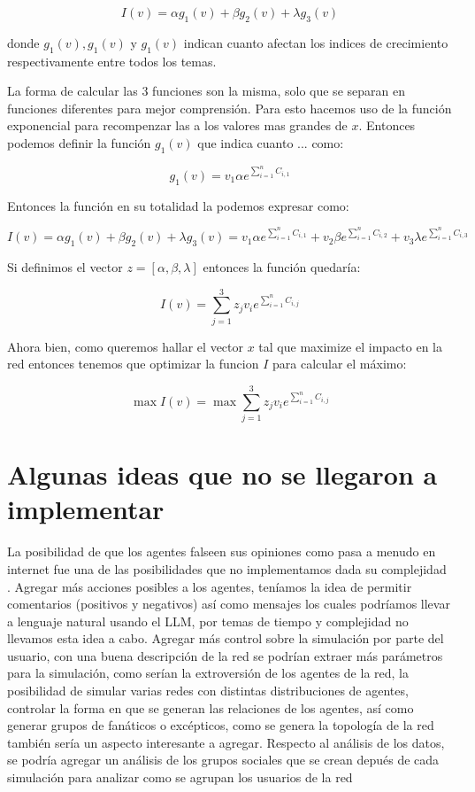 \documentclass[acmtog]{acmart}
\begin{document}
$$
I(v) = \alpha g_1(v) + \beta g_2(v) + \lambda g_3(v)
$$

donde $g_1(v), g_1(v)$ y $g_1(v)$ indican cuanto afectan los indices de crecimiento respectivamente entre todos los temas.

La forma de calcular las 3 funciones son la misma, solo que se separan en funciones diferentes para mejor comprensión. Para esto hacemos uso de la función exponencial para recompenzar las a los valores mas grandes de $x$. Entonces podemos definir la función $g_1(v)$ que indica cuanto ... como:

$$
g_1(v) = v_1 \alpha e ^ {\sum_{i=1}^{n} C_{i,1}} 
$$

Entonces la función en su totalidad la podemos expresar como:

$$
I(v) = \alpha g_1(v) + \beta g_2(v) + \lambda g_3(v) = v_1 \alpha e ^ {\sum_{i=1}^{n} C_{i,1}} + v_2 \beta e ^ {\sum_{i=1}^{n} C_{i,2}} + v_3 \lambda e ^ {\sum_{i=1}^{n} C_{i,3}}
$$

Si definimos el vector $z = [\alpha, \beta, \lambda]$ entonces la función quedaría:

$$
I(v) = \sum_{j=1}^{3} z_j v_i  e ^ {\sum_{i=1}^{n} C_{i,j}}
$$

Ahora bien, como queremos hallar el vector $x$ tal que maximize el impacto en la red entonces tenemos que optimizar la funcion $I$ para calcular el máximo:

$$
\max I(v) = \max \sum_{j=1}^{3} z_j v_i e ^ {\sum_{i=1}^{n} C_{i,j}}
$$


\section{Algunas ideas que no se llegaron a implementar}
La posibilidad de que los agentes falseen sus opiniones como pasa a menudo en internet fue una de las posibilidades que no implementamos dada su complejidad . Agregar más acciones posibles a los agentes, teníamos la idea de permitir comentarios (positivos y negativos) así como mensajes los cuales podríamos llevar a lenguaje natural usando el LLM, por temas de tiempo y complejidad no llevamos esta idea a cabo. Agregar más control sobre la simulación por parte del usuario, con una buena descripción de la red se podrían extraer más parámetros para la simulación, como serían la extroversión de los agentes de la red, la posibilidad de simular varias redes con distintas distribuciones de agentes, controlar la forma en que se generan las relaciones de los agentes, así como generar grupos de fanáticos o excépticos, como se genera la topología de la red también sería un aspecto interesante a agregar. Respecto al análisis de los datos, se podría agregar un análisis de los grupos sociales que se crean depués de cada simulación para analizar como se agrupan los usuarios de la red
\end{document}
